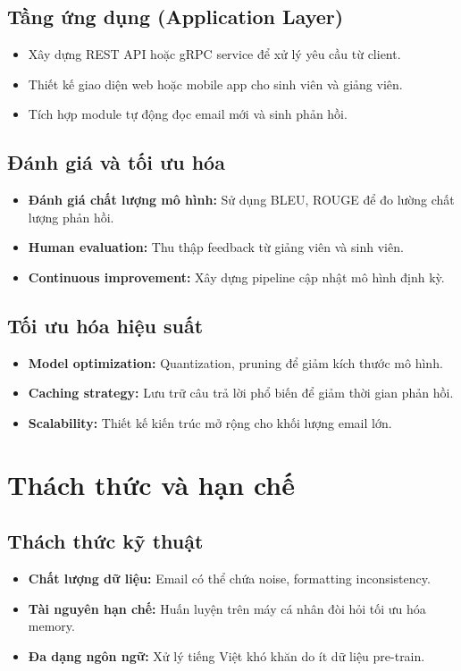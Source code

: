 \documentclass[../DoAn.tex]{subfiles}
\begin{document}
\subsection{Tầng ứng dụng (Application Layer)}
\begin{itemize}
    \item Xây dựng REST API hoặc gRPC service để xử lý yêu cầu từ client.
    \item Thiết kế giao diện web hoặc mobile app cho sinh viên và giảng viên.
    \item Tích hợp module tự động đọc email mới và sinh phản hồi.
\end{itemize}

\subsection{Đánh giá và tối ưu hóa}
\begin{itemize}
    \item \textbf{Đánh giá chất lượng mô hình:} Sử dụng BLEU, ROUGE để đo lường chất lượng phản hồi.
    \item \textbf{Human evaluation:} Thu thập feedback từ giảng viên và sinh viên.
    \item \textbf{Continuous improvement:} Xây dựng pipeline cập nhật mô hình định kỳ.
\end{itemize}

\subsection{Tối ưu hóa hiệu suất}
\begin{itemize}
    \item \textbf{Model optimization:} Quantization, pruning để giảm kích thước mô hình.
    \item \textbf{Caching strategy:} Lưu trữ câu trả lời phổ biến để giảm thời gian phản hồi.
    \item \textbf{Scalability:} Thiết kế kiến trúc mở rộng cho khối lượng email lớn.
\end{itemize}

\section{Thách thức và hạn chế}

\subsection{Thách thức kỹ thuật}
\begin{itemize}
    \item \textbf{Chất lượng dữ liệu:} Email có thể chứa noise, formatting inconsistency.
    \item \textbf{Tài nguyên hạn chế:} Huấn luyện trên máy cá nhân đòi hỏi tối ưu hóa memory.
    \item \textbf{Đa dạng ngôn ngữ:} Xử lý tiếng Việt khó khăn do ít dữ liệu pre-train.
\end{itemize}
\end{document}
